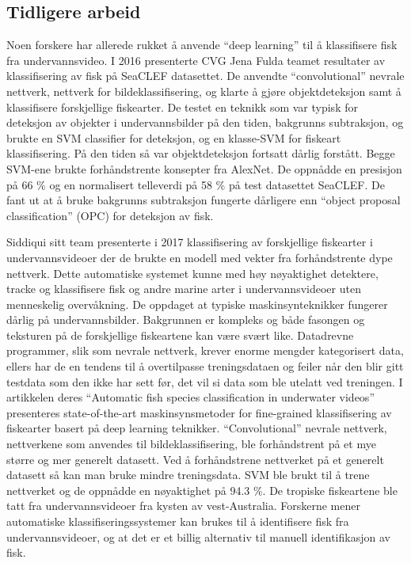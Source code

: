 
\subsection{Tidligere arbeid}

Noen forskere har allerede rukket å anvende ``deep learning'' til å klassifisere fisk fra undervannsvideo. I 2016 presenterte CVG Jena Fulda teamet resultater av klassifisering av fisk på SeaCLEF datasettet. De anvendte ``convolutional'' nevrale nettverk, nettverk for bildeklassifisering, og klarte å gjøre objektdeteksjon samt å klassifisere forskjellige fiskearter. De testet en teknikk som var typisk for deteksjon av objekter i undervannsbilder på den tiden, bakgrunns subtraksjon, og brukte en SVM classifier for deteksjon, og en klasse-SVM for fiskeart klassifisering. På den tiden så var objektdeteksjon fortsatt dårlig forstått. Begge SVM-ene brukte forhåndstrente konsepter fra AlexNet. De oppnådde en presisjon på 66 \% og en normalisert telleverdi på 58 \% på test datasettet SeaCLEF. De fant ut at å bruke bakgrunns subtraksjon fungerte dårligere enn ``object proposal classification'' (OPC) for deteksjon av fisk. \cite{Rodner m.fl. 2016}

Siddiqui sitt team presenterte i 2017 klassifisering av forskjellige fiskearter i undervannsvideoer der de brukte en modell med vekter fra forhåndstrente dype nettverk. Dette automatiske systemet kunne med høy nøyaktighet detektere, tracke og klassifisere fisk og andre marine arter i undervannsvideoer uten menneskelig overvåkning. De oppdaget at typiske maskinsynteknikker fungerer dårlig på undervannsbilder. Bakgrunnen er kompleks og både fasongen og teksturen på de forskjellige fiskeartene kan være svært like. Datadrevne programmer, slik som nevrale nettverk, krever enorme mengder kategorisert data, ellers har de en tendens til å overtilpasse treningsdataen og feiler når den blir gitt testdata som den ikke har sett før, det vil si data som ble utelatt ved treningen. I artikkelen deres  ``Automatic fish species classification in underwater videos'' presenteres state-of-the-art maskinsynsmetoder for fine-grained klassifisering av fiskearter basert på deep learning teknikker. ``Convolutional'' nevrale nettverk, nettverkene som anvendes til bildeklassifisering, ble forhåndstrent på et mye større og mer generelt datasett. Ved å forhåndstrene nettverket på et generelt datasett så kan man bruke mindre treningsdata. SVM ble brukt til å trene nettverket og de oppnådde en nøyaktighet på 94.3 \%. De tropiske fiskeartene ble tatt fra undervannsvideoer fra kysten av vest-Australia. Forskerne mener automatiske klassifiseringssystemer kan brukes til å identifisere fisk fra undervannsvideoer, og at det er et billig alternativ til manuell identifikasjon av fisk. \cite{Siddiqui m.fl. 2017}

